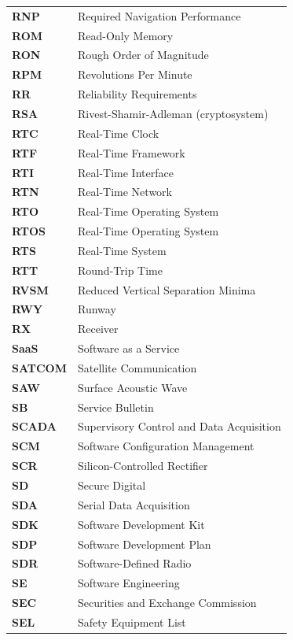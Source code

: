 \begin{longtable}{p{3cm}p{11cm}}
\textbf{RNP} & Required Navigation Performance \\
\textbf{ROM} & Read-Only Memory \\
\textbf{RON} & Rough Order of Magnitude \\
\textbf{RPM} & Revolutions Per Minute \\
\textbf{RR} & Reliability Requirements \\
\textbf{RSA} & Rivest-Shamir-Adleman (cryptosystem) \\
\textbf{RTC} & Real-Time Clock \\
\textbf{RTF} & Real-Time Framework \\
\textbf{RTI} & Real-Time Interface \\
\textbf{RTN} & Real-Time Network \\
\textbf{RTO} & Real-Time Operating System \\
\textbf{RTOS} & Real-Time Operating System \\
\textbf{RTS} & Real-Time System \\
\textbf{RTT} & Round-Trip Time \\
\textbf{RVSM} & Reduced Vertical Separation Minima \\
\textbf{RWY} & Runway \\
\textbf{RX} & Receiver \\
\textbf{SaaS} & Software as a Service \\
\textbf{SATCOM} & Satellite Communication \\
\textbf{SAW} & Surface Acoustic Wave \\
\textbf{SB} & Service Bulletin \\
\textbf{SCADA} & Supervisory Control and Data Acquisition \\
\textbf{SCM} & Software Configuration Management \\
\textbf{SCR} & Silicon-Controlled Rectifier \\
\textbf{SD} & Secure Digital \\
\textbf{SDA} & Serial Data Acquisition \\
\textbf{SDK} & Software Development Kit \\
\textbf{SDP} & Software Development Plan \\
\textbf{SDR} & Software-Defined Radio \\
\textbf{SE} & Software Engineering \\
\textbf{SEC} & Securities and Exchange Commission \\
\textbf{SEL} & Safety Equipment List \\

\end{longtable}
